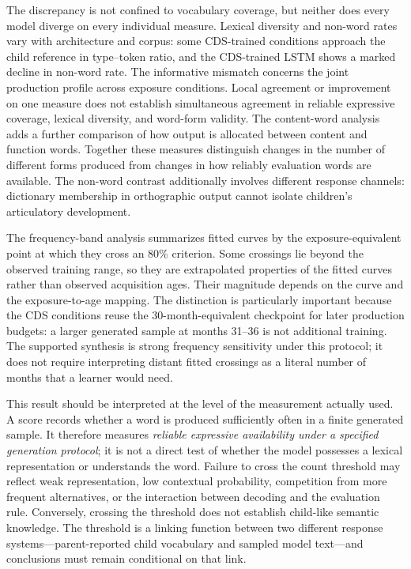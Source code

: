 The discrepancy is not confined to vocabulary coverage, but neither does every model diverge on every individual measure. Lexical diversity and non-word rates vary with architecture and corpus: some CDS-trained conditions approach the child reference in type--token ratio, and the CDS-trained LSTM shows a marked decline in non-word rate. The informative mismatch concerns the joint production profile across exposure conditions. Local agreement or improvement on one measure does not establish simultaneous agreement in reliable expressive coverage, lexical diversity, and word-form validity. The content-word analysis adds a further comparison of how output is allocated between content and function words. Together these measures distinguish changes in the number of different forms produced from changes in how reliably evaluation words are available. The non-word contrast additionally involves different response channels: dictionary membership in orthographic output cannot isolate children's articulatory development.

The frequency-band analysis summarizes fitted curves by the exposure-equivalent point at which they cross an 80\% criterion. Some crossings lie beyond the observed training range, so they are extrapolated properties of the fitted curves rather than observed acquisition ages. Their magnitude depends on the curve and the exposure-to-age mapping. The distinction is particularly important because the CDS conditions reuse the 30-month-equivalent checkpoint for later production budgets: a larger generated sample at months 31--36 is not additional training. The supported synthesis is strong frequency sensitivity under this protocol; it does not require interpreting distant fitted crossings as a literal number of months that a learner would need.

This result should be interpreted at the level of the measurement actually used. A \meCDI{} score records whether a word is produced sufficiently often in a finite generated sample. It therefore measures \emph{reliable expressive availability under a specified generation protocol}; it is not a direct test of whether the model possesses a lexical representation or understands the word. Failure to cross the count threshold may reflect weak representation, low contextual probability, competition from more frequent alternatives, or the interaction between decoding and the evaluation rule. Conversely, crossing the threshold does not establish child-like semantic knowledge. The threshold is a linking function between two different response systems---parent-reported child vocabulary and sampled model text---and conclusions must remain conditional on that link.

